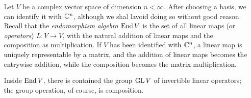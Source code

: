 \begin{example}
  Let \(V\) be a complex vector space of dimension \(n<\infty\). After
  choosing a basis, we can identify it with \(\mathbb{C}^n\), although we shal
  lavoid doing so without good reason. Recall that the \emph{endomorphism
    algebra \(\operatorname{End} V\)} is the set of all linear maps (or \emph{operators})
  \(L\colon V\to V\), with the natural addition of linear maps and the
  composition as multiplication. If \(V\) has been identified with
  \(\mathbb{C}^n\), a linear map is uniquely representable by a matrix, and the
  addition of linear maps becomes the entrywise addition, while the
  composition becomes the matrix multiplication.

  Inside \(\operatorname{End} V\), there is contained the group \(\operatorname{GL} V\) of invertible
  linear operators; the group operation, of course, is composition.
\end{example}

